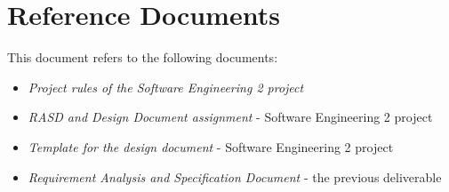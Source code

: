 \section{Reference Documents}
\label{sec:reference}

This document refers to the following documents:
\begin{itemize}
    \item \emph{Project rules of the Software Engineering 2 project}~\cite{se-project-rules}
    \item \emph{RASD and Design Document assignment} - Software Engineering 2 project~\cite{se-assignment}
    \item \emph{Template for the design document} - Software Engineering 2 project~\cite{dd-template}
    \item \emph{Requirement Analysis and Specification Document} - the previous deliverable~\cite{rasd}
\end{itemize}
